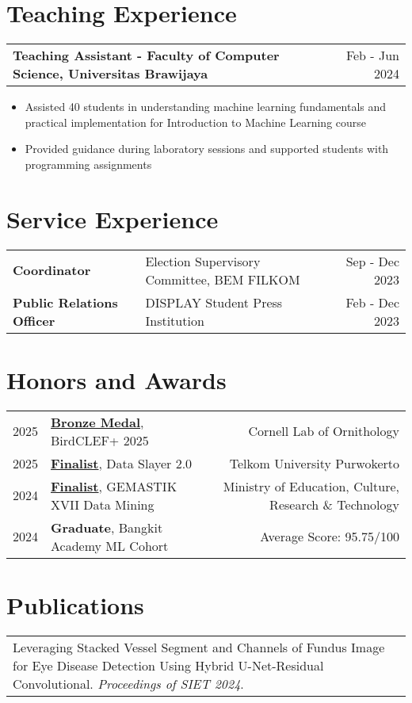 \documentclass[a4paper,10pt]{article}
\makeatletter
\newenvironment{joblong}[2]
    {
    \begin{tabularx}{\linewidth}{@{}l X r@{}}
    \textbf{#1} & \hfill & #2 \\[2pt]
    \end{tabularx}
    \begin{minipage}[t]{\linewidth}
    \begin{itemize}[nosep,after=\strut, leftmargin=1em, itemsep=1pt, label=\textbullet]
    }
    {
    \end{itemize}
    \end{minipage}    
    }
\makeatother
\begin{document}
\section{Teaching Experience}

\begin{joblong}{Teaching Assistant - Faculty of Computer Science, Universitas Brawijaya}{Feb - Jun 2024}
\item Assisted 40 students in understanding machine learning fundamentals and practical implementation for Introduction to Machine Learning course
\item Provided guidance during laboratory sessions and supported students with programming assignments
\end{joblong}

\section{Service Experience}
\begin{tabularx}{\linewidth}{@{}l X r@{}}
\textbf{Coordinator} & Election Supervisory Committee, BEM FILKOM & Sep - Dec 2023 \\
\textbf{Public Relations Officer} & DISPLAY Student Press Institution & Feb - Dec 2023 \\
\end{tabularx}

\section{Honors and Awards}
\begin{tabularx}{\linewidth}{@{}l X r@{}}
2025 & \href{https://drive.google.com/file/d/1HlHqBQiY5aCp8P5qI-VP7Qo11Sv0Op5J/view?usp=drive_link}{\textbf{Bronze Medal}}, BirdCLEF+ 2025 & Cornell Lab of Ornithology \\
2025 & \href{https://drive.google.com/file/d/1C0Lqpp6gYZGfwgYtDjUa75PJxaKPobHK/view?usp=drive_link}{\textbf{Finalist}}, Data Slayer 2.0 & Telkom University Purwokerto \\
2024 & \href{https://drive.google.com/file/d/1IgvW4PnoxvhXLq-yllY7VhY5LpvlcQp-/view?usp=drive_link}{\textbf{Finalist}}, GEMASTIK XVII Data Mining & Ministry of Education, Culture, Research \& Technology \\
2024 & \textbf{Graduate}, Bangkit Academy ML Cohort & Average Score: 95.75/100 \\
\end{tabularx}

\section{Publications}
\begin{tabularx}{\linewidth}{@{}X@{}}
Leveraging Stacked Vessel Segment and Channels of Fundus Image for Eye Disease Detection Using Hybrid U-Net-Residual Convolutional. \textit{Proceedings of SIET 2024}. \\
\end{tabularx}
\end{document}
